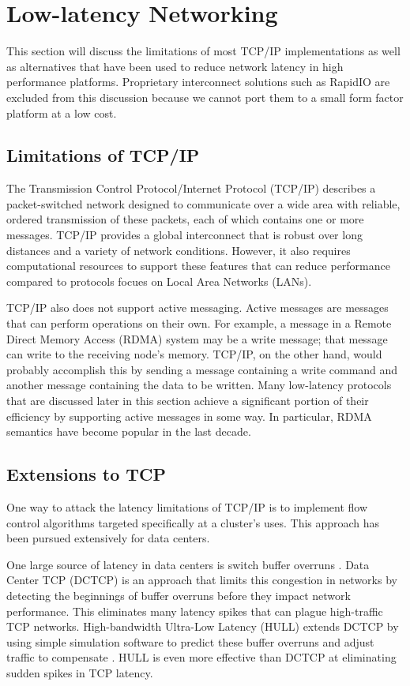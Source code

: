\documentclass[11pt]{book}
\begin{document}
\section{\textbf{Low-latency Networking}}

This section will discuss the limitations of most TCP/IP implementations as well
as alternatives that have been used to reduce network latency in high
performance platforms. Proprietary interconnect solutions such as
RapidIO are excluded from this discussion because we cannot port them to a
small form factor platform at a low cost.

\subsection{\textbf{Limitations of TCP/IP}}

The Transmission Control Protocol/Internet Protocol (TCP/IP) describes a packet-switched
network designed to communicate over a wide area with reliable, ordered
transmission of these packets, each of which contains one or more
messages. TCP/IP provides a global interconnect that is robust over long
distances and a variety of network conditions. However, it also requires
computational resources to support these features that can reduce performance
compared to protocols focues on Local Area Networks (LANs).

TCP/IP also does not support active messaging. Active messages are messages that
can perform operations on their own. For example, a message in a Remote Direct
Memory Access (RDMA) system may be a write message; that message can write to
the receiving node's memory. TCP/IP, on the other hand, would probably accomplish
this by sending a message containing a write command and another message
containing the data to be written. Many low-latency protocols that are discussed
later in this section achieve a significant portion of their efficiency by
supporting active messages in some way. In particular, RDMA semantics have
become popular in the last decade.

\subsection{\textbf{Extensions to TCP}}

One way to attack the latency limitations of TCP/IP is to implement flow control
algorithms targeted specifically at a cluster's uses. This approach has been
pursued extensively for data centers.

One large source of latency in data centers is switch buffer overruns
\cite{liu-13}. Data Center TCP (DCTCP) is an approach that limits this
congestion in networks by detecting the beginnings of buffer overruns before they impact
network performance. This eliminates many latency spikes that can plague
high-traffic TCP networks. High-bandwidth Ultra-Low Latency (HULL) extends DCTCP
by using simple simulation software to predict these buffer overruns and adjust
traffic to compensate \cite{liu-13}. HULL is even more effective than DCTCP at
eliminating sudden spikes in TCP latency.
\end{document}
